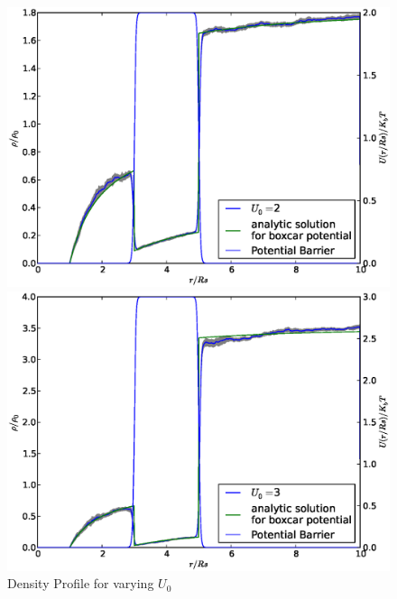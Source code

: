 \begin{figure}[H]
\begin{minipage}{.5 \textwidth}
    \includegraphics[width=.95 \textwidth, keepaspectratio]{plots/cp/uo/Un2.eps}
\end{minipage}\begin{minipage}{.5 \textwidth}
    \includegraphics[width=.95 \textwidth, keepaspectratio]{plots/cp/uo/Un3.eps}
\end{minipage}
 
    \caption{Density Profile for varying $U_0$}
    \label{fig:RhoU0Cp}
\end{figure}

